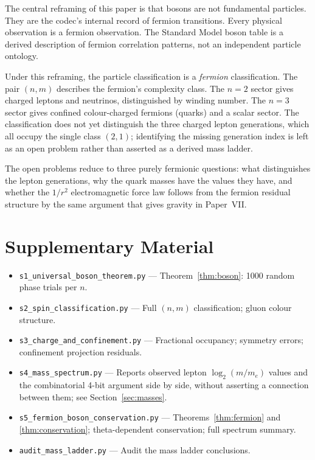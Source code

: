\documentclass[11pt]{article}
\begin{document}
The central reframing of this paper is that bosons are not
fundamental particles.
They are the codec's internal record of fermion transitions.
Every physical observation is a fermion observation.
The Standard Model boson table is a derived description of fermion
correlation patterns, not an independent particle ontology.

Under this reframing, the particle classification is a
\emph{fermion} classification.
The pair $(n, m)$ describes the fermion's complexity class.
The $n{=}2$ sector gives charged leptons and neutrinos, distinguished
by winding number.
The $n{=}3$ sector gives confined colour-charged fermions (quarks)
and a scalar sector.
The classification does not yet distinguish the three charged lepton
generations, which all occupy the single class $(2,1)$; identifying
the missing generation index is left as an open problem rather than
asserted as a derived mass ladder.

The open problems reduce to three purely fermionic questions: what
distinguishes the lepton generations, why the quark masses have the
values they have, and whether the $1/r^2$ electromagnetic force law
follows from the fermion residual structure by the same argument
that gives gravity in Paper~VII.

\section*{Supplementary Material}

\begin{itemize}
\item \texttt{s1\_universal\_boson\_theorem.py} ---
        Theorem~\ref{thm:boson}: 1000 random phase trials per $n$.
\item \texttt{s2\_spin\_classification.py} ---
        Full $(n,m)$ classification; gluon colour structure.
\item \texttt{s3\_charge\_and\_confinement.py} ---
        Fractional occupancy; symmetry errors; confinement
        projection residuals.
\item \texttt{s4\_mass\_spectrum.py} ---
        Reports observed lepton $\log_2(m/m_e)$ values and the
        combinatorial 4-bit argument side by side, without asserting
        a connection between them; see Section~\ref{sec:masses}.
\item \texttt{s5\_fermion\_boson\_conservation.py} ---
        Theorems~\ref{thm:fermion} and \ref{thm:conservation};
        theta-dependent conservation; full spectrum summary.
\item \texttt{audit\_mass\_ladder.py} --- Audit the mass ladder conclusions.
\end{itemize}

\printbibliography
\end{document}
